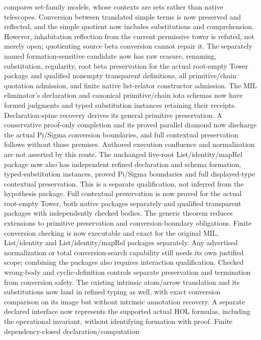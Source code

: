 \documentclass[11pt]{article}
\theoremstyle{definition}
\theoremstyle{remark}
\begin{document}
\begin{enumerate}
  compares set-family models, whose contexts are sets rather than native
  telescopes. Conversion between translated simple terms is now preserved
  and reflected, and the simple quotient now includes substitutions and
  comprehension. However, inhabitation reflection from the current
  permissive tower is refuted, not merely open; quotienting source beta
  conversion cannot repair it. The separately named formation-sensitive
  candidate now has raw erasure, renaming, substitution, regularity,
  root beta preservation for the actual root-empty Tower package and
  qualified nonempty transparent definitions, all
  primitive/chain quotation admission, and finite native list-relator
  constructor admission. The MIL eliminator's declaration and canonical
  primitive/chain iota schemas now have formed judgments and typed
  substitution instances retaining their receipts. Declaration-spine
  recovery derives its general primitive preservation. A conservative
  proof-only completion and its proved parallel diamond now discharge the
  actual Pi/Sigma conversion boundaries, and full contextual preservation
  follows without those premises. Authored execution confluence and
  normalization are not asserted by this route.
  The unchanged five-root List/identity/mapRel package now also has independent
  refined declaration and schema formation, typed-substitution instances,
  proved Pi/Sigma boundaries and full displayed-type contextual preservation.
  This is a separate qualification, not inferred from the hypothesis package.
  Full contextual preservation is now proved for the actual root-empty
  Tower, both native packages separately and qualified transparent packages with independently checked
  bodies. The generic theorem reduces extensions to primitive preservation
  and conversion-boundary obligations. Finite conversion checking is now
  executable and exact for the original MIL, List/identity and
  List/identity/mapRel packages separately. Any advertised normalization or total conversion-search
  capability still needs its own justified scope; combining the packages
  also requires interaction qualification. Checked wrong-body and
  cyclic-definition controls separate preservation and termination from
  conversion safety.
  The existing intrinsic atom/arrow translation and
  its substitutions now land in refined typing as well, with exact
  conversion comparison on its image but without intrinsic annotation
  recovery. A separate declared interface now represents the supported actual
  HOL formulas, including the operational invariant, without identifying
  formation with proof. Finite dependency-closed declaration/computation

\end{enumerate}
\end{document}
